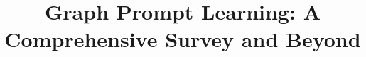 \documentclass[10pt,journal,compsoc]{IEEEtran}
\begin{document}
\title{Graph Prompt Learning: A Comprehensive Survey and Beyond}












\end{document}
